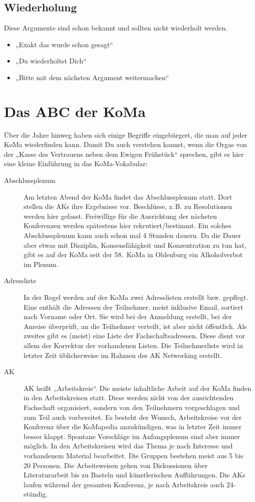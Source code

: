 \documentclass{neulingsheft}
\begin{document}
{\section{Wiederholung}
Diese Argumente sind schon bekannt und sollten nicht wiederholt werden.
\begin{itemize}
	\item „Exakt das wurde schon gesagt“
	\item „Du wiederholtst Dich“
	\item „Bitte mit dem nächsten Argument weitermachen“
\end{itemize}

\chapter{Das ABC der KoMa}

Über die Jahre hinweg haben sich einige Begriffe eingebürgert, die man auf
jeder KoMa wiederfinden kann. Damit Du auch verstehen kannst, wenn die Orgas
von der „Kasse des Vertrauens neben dem Ewigen Frühstück“ sprechen, gibt es
hier eine kleine Einführung in das KoMa-Vokabular:

\begin{description}
\item[Abschlussplenum] Am letzten Abend der KoMa findet das Abschlussplenum
	statt. Dort stellen die AKs ihre Ergebnisse vor. Beschlüsse, z.\,B. zu
	Resolutionen werden hier gefasst.  Freiwillige für die Ausrichtung der
	nächsten Konferenzen werden spätestens hier rekrutiert/bestimmt. Ein
	solches Abschlussplenum kann auch schon mal 4 Stunden dauern.  Da die
	Dauer aber etwas mit Disziplin, Konsensfähigkeit und Konzentration zu
	tun hat, gibt es auf der KoMa seit der 58.~KoMa in Oldenburg ein
	Alkoholverbot im Plenum.

\item[Adressliste] In der Regel werden auf der KoMa zwei Adresslisten erstellt
	bzw. gepflegt. Eine enthält die Adressen der Teilnehmer, meist inklusive
	Email, sortiert nach Vorname oder Ort. Sie wird bei der Anmeldung
	erstellt, bei der Anreise überprüft, an die Teilnehmer verteilt, ist
	aber nicht öffentlich. Als zweites gibt es (meist) eine Liste der
	Fachschaftsadressen. Diese dient vor allem der Korrektur der
	vorhandenen Listen. Die Teilnehmerliste wird in letzter Zeit
	üblicherweise im Rahmen des AK Networking erstellt.

\item[AK] AK heißt „Arbeitskreis“. Die meiste inhaltliche Arbeit auf der KoMa
	finden in den Arbeitskreisen statt. Diese werden nicht von der
	ausrichtenden Fachschaft organisiert, sondern von den Teilnehmern
	vorgeschlagen und zum Teil auch vorbereitet. Es besteht der Wunsch,
	Arbeitskreise vor der Konferenz über die KoMapedia anzukündigen, was in
	letzter Zeit immer besser klappt. Spontane Vorschläge im Anfangsplenum
	sind aber immer möglich. In den Arbeitskreisen wird das Thema je nach
	Interesse und vorhandenem Material bearbeitet. Die Gruppen bestehen
	meist aus 5 bis 20 Personen. Die Arbeitsweisen gehen von Diskussionen
	über Literaturarbeit bis zu Basteln und künstlerischen Aufführungen.
	Die AKs laufen während der gesamten Konferenz, je nach Arbeitskreis
	auch 24-stündig.


\end{description}}
\end{document}
